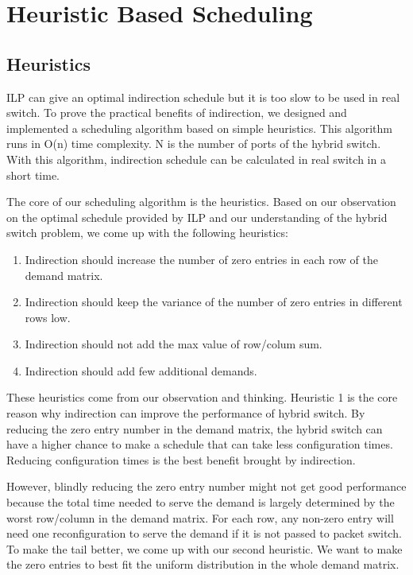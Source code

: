 \section{Heuristic Based Scheduling}
\label{sec:simres}
\subsection{Heuristics}
\label{subsec:heuristics}
ILP can give an optimal indirection schedule but it is too slow to be used in real switch. To prove the practical benefits of indirection, we designed and implemented a scheduling algorithm based on simple heuristics. This algorithm runs in O(n) time complexity. N is the number of ports of the hybrid switch. With this algorithm, indirection schedule can be calculated in real switch in a short time. 

The core of our scheduling algorithm is the heuristics. Based on our observation on the optimal schedule provided by ILP and our understanding of the hybrid switch problem, we come up with the following heuristics:

\begin{enumerate}
  \item Indirection should increase the number of zero entries in each row of the demand matrix.
  \item Indirection should keep the variance of the number of zero entries in different rows low.
  \item Indirection should not add the max value of row/colum sum.
  \item Indirection should add few additional demands.
\end{enumerate}

These heuristics come from our observation and thinking. Heuristic 1 is the core reason why indirection can improve the performance of hybrid switch. By reducing the zero entry number in the demand matrix, the hybrid switch can have a higher chance to make a schedule that can take less configuration times. Reducing configuration times is the best benefit brought by indirection.

However, blindly reducing the zero entry number might not get good performance because the total time needed to serve the demand is largely determined by the worst row/column in the demand matrix. For each row, any non-zero entry will need one reconfiguration to serve the demand if it is not passed to packet switch. To make the tail better, we come up with our second heuristic. We want to make the zero entries to best fit the uniform distribution in the whole demand matrix.

